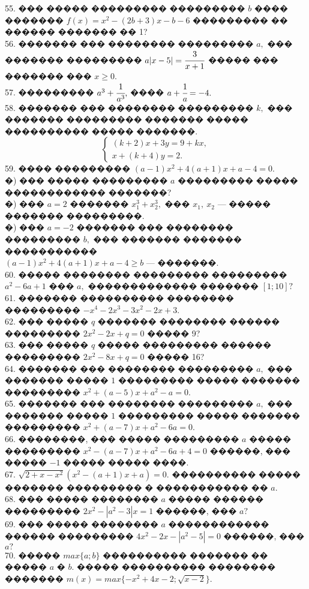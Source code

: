 \documentclass[12pt]{article}
\begin{document}
55. ��� ����� ��������� ��������� $b$ ���� ������� $f(x)=x^2-(2b+3)x-b-6$ ��������� �� ������ ������� �� 1?\\
56. ������� ��� �������� ��������� $a,$ ��� ������� ��������� $a|x-5|=\cfrac{3}{x+1}$ ����� ��� ������� ��� $x\geqslant 0.$\\
57. ��������� $a^3+\cfrac{1}{a^3},$ ���� $a+\cfrac{1}{a}=-4.$\\
58. ������� ��� �������� ��������� $k,$ ��� ������� ��������� ������� ����� ���������� ����� �������.
$$\begin{cases}
(k+2)x+3y=9+kx,\\
x+(k+4)y=2.
\end{cases}
$$
59. ���� ��������� $(a-1)x^2+4(a+1)x+a-4=0.$\\
�) ��� ����� ��������� $a$ ��������� ����� ������������ �������?\\
�) ��� $a=2$ ������� $x_1^3+x_2^3,$ ��� $x_1,\ x_2$ --- ����� ������� ���������.\\
�) ��� $a=-2$ ������� ��� �������� ��������� $b,$ ��� ������� ������� �����������\\ $(a-1)x^2+4(a+1)x+a-4\geqslant b$ --- �������.\\
60. ����� �������� ��������� ��������� $a^2-6a+1$ ��� $a,$ ������������� ������� $[1;10]?$\\
61. ������� ���������� �������� ��������� $-x^4-2x^3-3x^2-2x+3.$\\
62. ��� ����� $q$ ������� �������� ������ ��������� $2x^2-2x+q=0$ ����� 9?\\
63. ��� ����� $q$ ����� ��������� ������ ��������� $2x^2-8x+q=0$ ����� 16?\\
64. ������� ��� �������� ��������� $a,$ ��� ������� ����� $1$ ��������� ����� ������� ��������� $x^2+(a-5)x+a^2-a=0.$\\
65. ������� ��� �������� ��������� $a,$ ��� ������� ����� $1$ ��������� ����� ������� ��������� $x^2+(a-7)x+a^2-6a=0.$\\
66. ��������, ��� ����� ��������� $a$ ����� ��������� $x^2-(a-7)x+a^2-6a+4=0$ ������, ��� ����� $-1$ ����� ����� ����.\\
67. $\sqrt{2+x-x^2}(x^2-(a+1)x+a)=0.$ ���������� ����� ������� ��������� � ����������� �� $a.$\\
68. ��� ����� �������� $a$ ����� ������ ��������� $2x^2-|a^2-3|x=1$ ������, ��� $a?$\\
69. ��� ����� �������� $a$ ������������ ������ ��������� $4x^2-2x-|a^2-5|=0$ ������, ��� $a?$\\
70. ����� $max\{a;b\}$ ���������� ������� �� ����� $a$ � $b.$ ����� ���������� �������� ������� $m(x)=max\{-x^2+4x-2; \sqrt{x-2}\}.$\\
\end{document}
